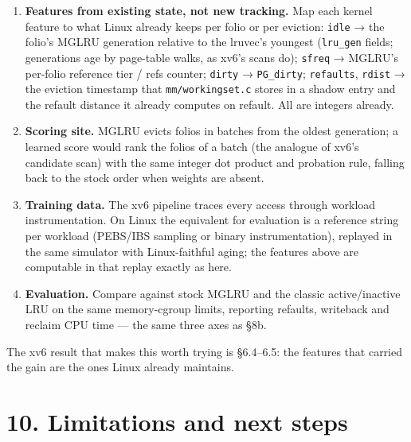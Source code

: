 \documentclass[10pt,a4paper]{article}
\newcommand{\code}[1]{\texttt{#1}}
\begin{document}
\begin{enumerate}
\item \textbf{Features from existing state, not new tracking.} Map each kernel feature to what Linux already keeps per folio or per eviction: \code{idle} → the folio's MGLRU generation relative to the lruvec's youngest (\code{lru\_\allowbreak{}gen} fields; generations age by page-table walks, as xv6's scans do); \code{sfreq} → MGLRU's per-folio reference tier / refs counter; \code{dirty} → \code{PG\_\allowbreak{}dirty}; \code{refaults}, \code{rdist} → the eviction timestamp that \code{mm/\allowbreak{}workingset.\allowbreak{}c} stores in a shadow entry and the refault distance it already computes on refault. All are integers already.
\item \textbf{Scoring site.} MGLRU evicts folios in batches from the oldest generation; a learned score would rank the folios of a batch (the analogue of xv6's candidate scan) with the same integer dot product and probation rule, falling back to the stock order when weights are absent.
\item \textbf{Training data.} The xv6 pipeline traces every access through workload instrumentation. On Linux the equivalent for evaluation is a reference string per workload (PEBS/IBS sampling or binary instrumentation), replayed in the same simulator with Linux-faithful aging; the features above are computable in that replay exactly as here.
\item \textbf{Evaluation.} Compare against stock MGLRU and the classic active/inactive LRU on the same memory-cgroup limits, reporting refaults, writeback and reclaim CPU time — the same three axes as §8b.
\end{enumerate}

The xv6 result that makes this worth trying is §6.4–6.5: the features that carried the gain are the ones Linux already maintains.

\section*{10. Limitations and next steps}
\end{document}
